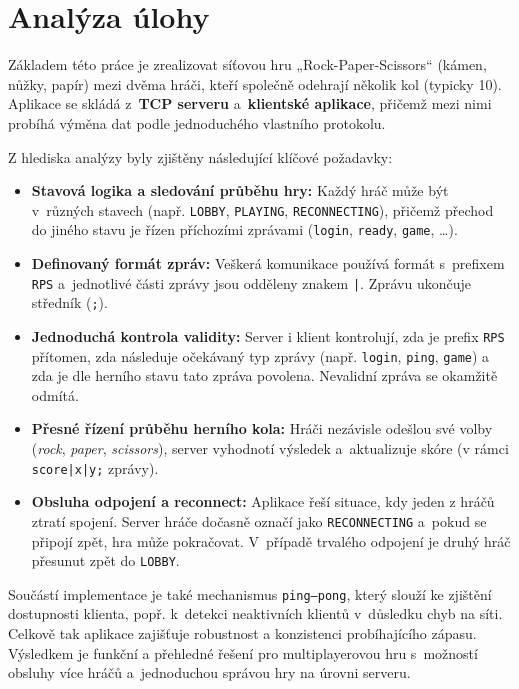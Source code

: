\documentclass[12pt, a4paper]{article}
\begin{document}
\section{Analýza úlohy}

Základem této práce je zrealizovat síťovou hru „Rock-Paper-Scissors“ (kámen, nůžky, papír) mezi dvěma hráči, kteří společně odehrají několik kol (typicky 10). Aplikace se skládá z~\textbf{TCP serveru} a~\textbf{klientské aplikace}, přičemž mezi nimi probíhá výměna dat podle jednoduchého vlastního protokolu.

Z hlediska analýzy byly zjištěny následující klíčové požadavky:
\begin{itemize}
    \item \textbf{Stavová logika a sledování průběhu hry:} Každý hráč může být v~různých stavech (např. \texttt{LOBBY}, \texttt{PLAYING}, \texttt{RECONNECTING}), přičemž přechod do jiného stavu je řízen příchozími zprávami (\texttt{login}, \texttt{ready}, \texttt{game}, \ldots).
    \item \textbf{Definovaný formát zpráv:} Veškerá komunikace používá formát s~prefixem \verb|RPS| a~jednotlivé části zprávy jsou odděleny znakem \texttt{|}. Zprávu ukončuje středník (\texttt{;}).
    \item \textbf{Jednoduchá kontrola validity:} Server i klient kontrolují, zda je prefix \verb|RPS| přítomen, zda následuje očekávaný typ zprávy (např. \texttt{login}, \texttt{ping}, \texttt{game}) a zda je dle herního stavu tato zpráva povolena. Nevalidní zpráva se okamžitě odmítá.
    \item \textbf{Přesné řízení průběhu herního kola:} Hráči nezávisle odešlou své volby (\emph{rock}, \emph{paper}, \emph{scissors}), server vyhodnotí výsledek a~aktualizuje skóre (v rámci \texttt{score|x|y;} zprávy).
    \item \textbf{Obsluha odpojení a reconnect:} Aplikace řeší situace, kdy jeden z hráčů ztratí spojení. Server hráče dočasně označí jako \texttt{RECONNECTING} a~pokud se připojí zpět, hra může pokračovat. V~případě trvalého odpojení je druhý hráč přesunut zpět do \texttt{LOBBY}.
\end{itemize}

Součástí implementace je také mechanismus \texttt{ping--pong}, který slouží ke zjištění dostupnosti klienta, popř. k~detekci neaktivních klientů v~důsledku chyb na síti. Celkově tak aplikace zajišťuje robustnost a konzistenci probíhajícího zápasu. Výsledkem je funkční a přehledné řešení pro multiplayerovou hru s~možností obsluhy více hráčů a~jednoduchou správou hry na úrovni serveru.
\end{document}
